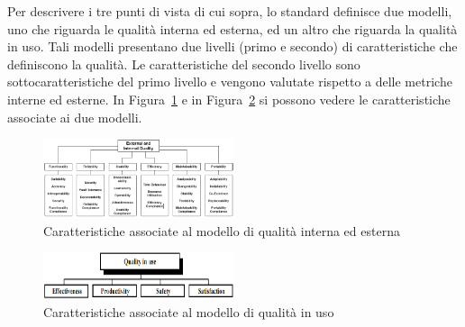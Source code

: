 Per descrivere i tre punti di vista di cui sopra, lo standard definisce due modelli, uno che riguarda le qualità interna ed esterna, ed un altro che riguarda la qualità in uso. Tali modelli presentano due livelli (primo e secondo) di caratteristiche che definiscono la qualità. Le caratteristiche del secondo livello sono sottocaratteristiche del primo livello e vengono valutate rispetto a delle metriche interne ed esterne. In Figura~\ref{fig:int_ext} e in Figura~\ref{fig:in_use} si possono vedere le caratteristiche associate ai due modelli.

\begin{figure}[h!]
	\centering
	\includegraphics[width=0.50\textwidth]{img/int_ext.png}
	\caption{Caratteristiche associate al modello di qualità interna ed esterna}
	\label{fig:int_ext}
\end{figure}

\begin{figure}[h!]
	\centering
	\includegraphics[width=0.50\textwidth]{img/in_use.png}
	\caption{Caratteristiche associate al modello di qualità in uso}
	\label{fig:in_use}
\end{figure}


